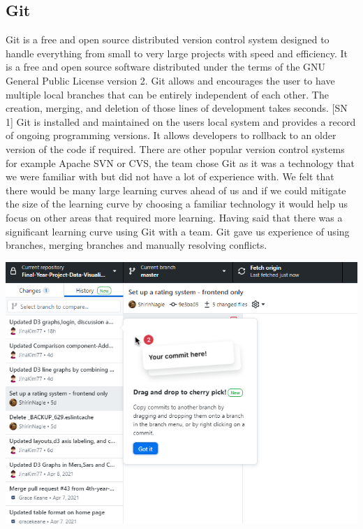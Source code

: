 \subsection{Git}
Git is a free and open source distributed version control system designed to handle everything from small to very large projects with speed and efficiency. It is a free and open source software distributed under the terms of the GNU General Public License version 2.
Git allows and encourages the user to have multiple local branches that can be entirely independent of each other. The creation, merging, and deletion of those lines of development takes seconds. [SN 1] 
Git is installed and maintained on the users local system and provides a record of ongoing programming versions. It allows developers to rollback to an older version of the code if required.
There are other popular version control systems for example Apache SVN or CVS, the team chose Git as it was a technology that we were familiar with but did not have a lot of experience with. We felt that there would be many large learning curves ahead of us and if we could mitigate the size of the learning curve by choosing a familiar technology it would help us focus on other areas that required more learning. Having said that there was a significant learning curve using Git with a team. Git gave us experience of using branches, merging branches and manually resolving conflicts.
\begin{center}    
      \includegraphics[scale=0.7]{img/git.PNG}
\end{center}

